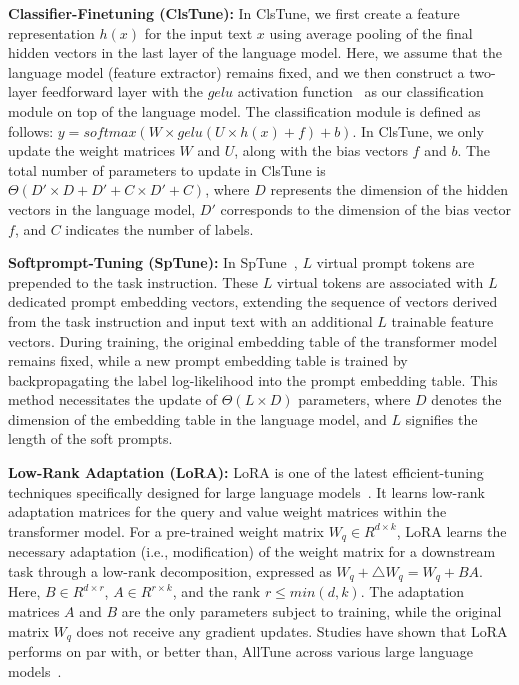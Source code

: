 \documentclass[11pt]{article}
\begin{document}
\textbf{Classifier-Finetuning (ClsTune):} In ClsTune, we first create a feature representation $h(x)$ for the input text $x$ using average pooling of the final hidden vectors in the last layer of the language model. Here, we assume that the language model (feature extractor) remains fixed, and we then construct a two-layer feedforward layer with the $gelu$ activation function~\cite{DBLP:journals/corr/HendrycksG16} as our classification module on top of the language model. The classification module is defined as follows: $y = softmax(W \times gelu(U \times h(x) + f) + b)$. In ClsTune, we only update the weight matrices $W$ and $U$, along with the bias vectors $f$ and $b$. The total number of parameters to update in ClsTune is $\Theta(D' \times D + D' + C \times D' + C)$, where $D$ represents the dimension of the hidden vectors in the language model, $D'$ corresponds to the dimension of the bias vector $f$, and $C$ indicates the number of labels.

\textbf{Softprompt-Tuning (SpTune):} In SpTune~\cite{lester-etal-2021-power}, $L$ virtual prompt tokens are prepended to the task instruction. These $L$ virtual tokens are associated with $L$ dedicated prompt embedding vectors, extending the sequence of vectors derived from the task instruction and input text with an additional $L$ trainable feature vectors. During training, the original embedding table of the transformer model remains fixed, while a new prompt embedding table is trained by backpropagating the label log-likelihood into the prompt embedding table. This method necessitates the update of $\Theta(L \times D)$ parameters, where $D$ denotes the dimension of the embedding table in the language model, and $L$ signifies the length of the soft prompts.

\textbf{Low-Rank Adaptation (LoRA):} LoRA is one of the latest efficient-tuning techniques specifically designed for large language models~\cite{DBLP:journals/corr/abs-2106-09685}. It learns low-rank adaptation matrices for the query and value weight matrices within the transformer model. For a pre-trained weight matrix $W_q \in R^{d \times k}$, LoRA learns the necessary adaptation (i.e., modification) of the weight matrix for a downstream task through a low-rank decomposition, expressed as $W_q + \triangle W_q = W_q + BA$. Here, $B \in R^{d \times r}$, $A \in R^{r \times k}$, and the rank $r \le min(d, k)$. The adaptation matrices $A$ and $B$ are the only parameters subject to training, while the original matrix $W_q$ does not receive any gradient updates. Studies have shown that LoRA performs on par with, or better than, AllTune across various large language models~\cite{DBLP:journals/corr/abs-2106-09685}.
\end{document}
